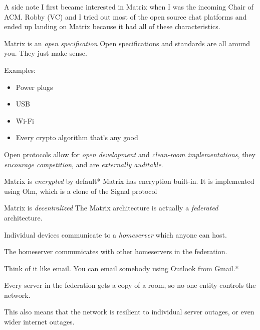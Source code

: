 \documentclass{acm}
\begin{document}
\begin{frame}{A side note}
    I first became interested in Matrix when I was the incoming Chair of ACM.
    Robby (VC) and I tried out most of the open source chat platforms and ended
    up landing on Matrix because it had all of these characteristics.
\end{frame}

\begin{frame}{Matrix is an \textit{open specification}}
    Open specifications and standards are all around you. They just make
    sense\texttrademark.

    Examples:\pause
    \begin{itemize}
        \item Power plugs
        \item USB
        \item Wi-Fi
        \item Every crypto algorithm that's any good
    \end{itemize}
    \pause

    Open protocols allow for \textit{open development} and  \textit{clean-room
    implementations}, they \textit{encourage competition}, and are
    \textit{externally auditable}.
\end{frame}

\begin{frame}{Matrix is \textit{encrypted} by default*}
    Matrix has encryption built-in. It is implemented using Olm, which is a
    clone of the Signal protocol

\end{frame}

\begin{frame}{Matrix is \textit{decentralized}}
    The Matrix architecture is actually a \textit{federated} architecture.

    Individual devices communicate to a \textit{homeserver} which anyone can
    host.

    The homeserver communicates with other homeservers in the federation.
    \pause

    Think of it like email. You can email somebody using Outlook from Gmail.*
    \pause

    Every server in the federation gets a copy of a room, so no one entity
    controls the network.
    \pause

    This also means that the network is resilient to individual server outages,
    or even wider internet outages.
\end{frame}
\end{document}
